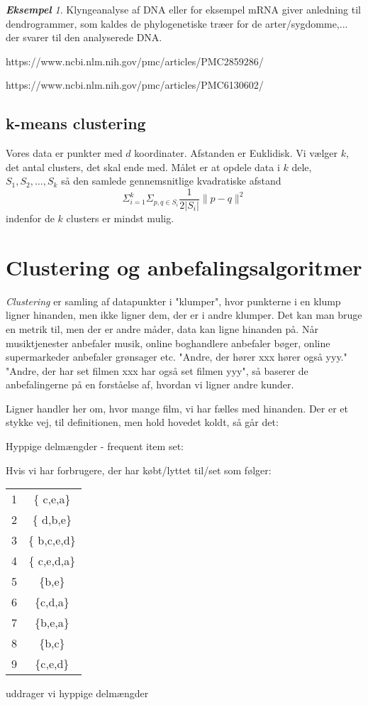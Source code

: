 \documentclass[a4paper, 12pt]{article}
\theoremstyle{remark}
\newtheorem{Eksempel}{\textbf{Eksempel}}
\begin{document}
\begin{Eksempel} Klyngeanalyse af DNA eller for eksempel mRNA giver anledning til dendrogrammer, som kaldes de phylogenetiske træer for de arter/sygdomme,... der svarer til den analyserede DNA. 

https://www.ncbi.nlm.nih.gov/pmc/articles/PMC2859286/

https://www.ncbi.nlm.nih.gov/pmc/articles/PMC6130602/
\end{Eksempel}
\subsection*{k-means clustering}
 Vores data er punkter med $d$ koordinater. Afstanden er Euklidisk. Vi vælger $k$, det antal clusters, det skal ende med. Målet er at opdele data i $k$ dele, $S_1, S_2,\ldots , S_k$ så den samlede gennemsnitlige kvadratiske afstand $$\Sigma_{i=1}^{k}\Sigma_{p,q\in S_i}\frac{1}{2|S_i|}\|p-q\|^2$$ indenfor de $k$ clusters er mindst mulig. 







\section*{Clustering og anbefalingsalgoritmer}

\emph{Clustering} er samling af datapunkter i "klumper", hvor punkterne i en klump ligner hinanden, men ikke ligner dem, der er i andre klumper. Det kan man bruge en metrik til, men der er andre måder, data kan ligne hinanden på. Når musiktjenester anbefaler musik, online boghandlere anbefaler bøger, online supermarkeder anbefaler grønsager etc. "Andre, der hører xxx hører også yyy." "Andre, der har set filmen xxx har også set filmen yyy", så baserer de anbefalingerne på en forståelse af, hvordan vi ligner andre kunder. 

Ligner handler her om, hvor mange film, vi har fælles med hinanden. Der er et stykke vej, til definitionen, men hold hovedet koldt, så går det:

Hyppige delmængder - frequent item set:

Hvis vi har forbrugere, der har købt/lyttet til/set som følger:
\begin{center}
\begin{tabular}{cc}
1 & \{ c,e,a\} \\
2 & \{ d,b,e\} \\
3 & \{ b,c,e,d\} \\
4& \{ c,e,d,a\} \\
5& \{b,e\} \\
6& \{c,d,a\} \\
7&\{b,e,a\} \\
8& \{b,c\} \\
9& \{c,e,d\} 

\end{tabular}
\end{center}
uddrager vi hyppige delmængder
\end{document}

